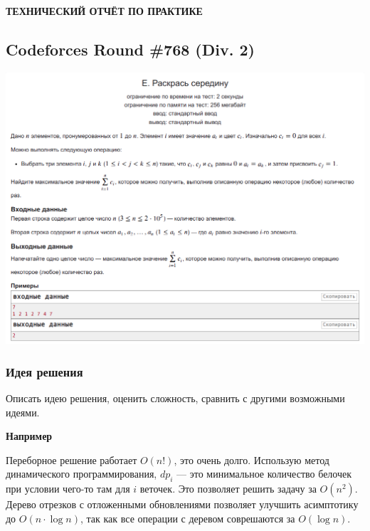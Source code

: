 %
%

\begin{center}
\bfseries{\large ТЕХНИЧЕСКИЙ ОТЧЁТ ПО ПРАКТИКЕ}
\end{center}

\subsection*{Codeforces Round \#768 (Div. 2)}
\begin{center}
\includegraphics[width=\textwidth]{statements/sample-cf.png}
\end{center}
\subsubsection*{Идея решения}
Описать идею решения, оценить сложность, сравнить с другими возможными идеями.

{\bfseries \large Например}

Переборное решение работает $O(n!)$, это очень долго. Использую метод динамического программирования, $dp_i$ --- это минимальное количество белочек при условии чего-то там для $i$ веточек. Это позволяет решить задачу за $O(n ^ 2)$. Дерево отрезков с отложенными обновлениями позволяет улучшить асимптотику до $O(n \cdot \log{n})$, так как все операции с деревом соврешаются за $O(\log{n})$.

